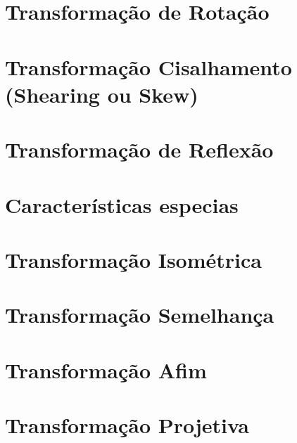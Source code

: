 \documentclass[
  brazilian,
]{book}
\begin{document}
\hypertarget{transformauxe7uxe3o-de-rotauxe7uxe3o}{%
\section{Transformação de Rotação}\label{transformauxe7uxe3o-de-rotauxe7uxe3o}}

\hypertarget{transformauxe7uxe3o-cisalhamento-shearing-ou-skew}{%
\section{Transformação Cisalhamento (Shearing ou Skew)}\label{transformauxe7uxe3o-cisalhamento-shearing-ou-skew}}

\hypertarget{transformauxe7uxe3o-de-reflexuxe3o}{%
\section{Transformação de Reflexão}\label{transformauxe7uxe3o-de-reflexuxe3o}}

\hypertarget{caracteruxedsticas-especias}{%
\section{Características especias}\label{caracteruxedsticas-especias}}

\hypertarget{transformauxe7uxe3o-isomuxe9trica}{%
\section{Transformação Isométrica}\label{transformauxe7uxe3o-isomuxe9trica}}

\hypertarget{transformauxe7uxe3o-semelhanuxe7a}{%
\section{Transformação Semelhança}\label{transformauxe7uxe3o-semelhanuxe7a}}

\hypertarget{transformauxe7uxe3o-afim}{%
\section{Transformação Afim}\label{transformauxe7uxe3o-afim}}

\hypertarget{transformauxe7uxe3o-projetiva}{%
\section{Transformação Projetiva}\label{transformauxe7uxe3o-projetiva}}
\end{document}
